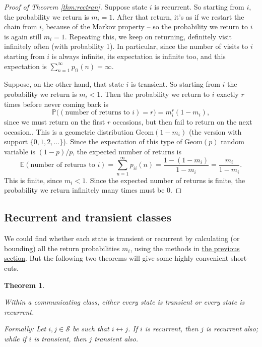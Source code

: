 \documentclass[
  a4paper,
]{article}
\newtheorem{theorem}{Theorem}[section]
\theoremstyle{definition}
\theoremstyle{definition}
\theoremstyle{definition}
\theoremstyle{remark}
\begin{document}
\begin{proof}[Proof of Theorem \ref{thm:rectran}]

Suppose state \(i\) is recurrent. So starting from \(i\), the probability we return is \(m_i = 1\). After that return, it's as if we restart the chain from \(i\), because of the Markov property -- so the probability we return to \(i\) is again still \(m_i = 1\). Repeating this, we keep on returning, definitely visit infinitely often (with probability 1). In particular, since the number of visits to \(i\) starting from \(i\) is always infinite, its expectation is infinite too, and this expectation is \(\sum_{n=1}^\infty p_{ii}(n) = \infty\).

Suppose, on the other hand, that state \(i\) is transient. So starting from \(i\) the probability we return is \(m_i < 1\). Then the probability we return to \(i\) exactly \(r\) times before never coming back is
\[  \mathbb P \big((\text{number of returns to $i$}) = r\big) = m_i^r(1-m_i) , \]
since we must return on the first \(r\) occasions, but then fail to return on the next occasion.. This is a geometric distribution \(\text{Geom}(1-m_i)\) (the version with support \(\{0,1,2,\dots\}\)). Since the expectation of this type of \(\text{Geom}(p)\) random variable is \((1 - p)/p\), the expected number of returns is
\[ \mathbb E(\text{number of returns to $i$}) = \sum_{n=1}^\infty p_{ii}(n)  = \frac{1 - (1 - m_i)}{1 - m_i} = \frac{m_i}{1 - m_i} . \]
This is finite, since \(m_i <1\). Since the expected number of returns is finite, the probability we return infinitely many times must be 0.

\end{proof}

\hypertarget{rec-tran-classes}{%
\subsection{Recurrent and transient classes}\label{rec-tran-classes}}

We could find whether each state is transient or recurrent by calculating (or bounding) all the return probabilities \(m_i\), using the methods in \protect\hyperlink{S08-hitting-times}{the previous section}. But the following two theorems will give some highly convenient short-cuts.

\begin{theorem}
\protect\hypertarget{thm:unlabeled-div-5}{}\label{thm:unlabeled-div-5}

Within a communicating class, either every state is transient or every state is recurrent.

Formally: Let \(i, j \in \mathcal S\) be such that \(i \leftrightarrow j\). If \(i\) is recurrent, then \(j\) is recurrent also; while if \(i\) is transient, then \(j\) transient also.

\end{theorem}
\end{document}
